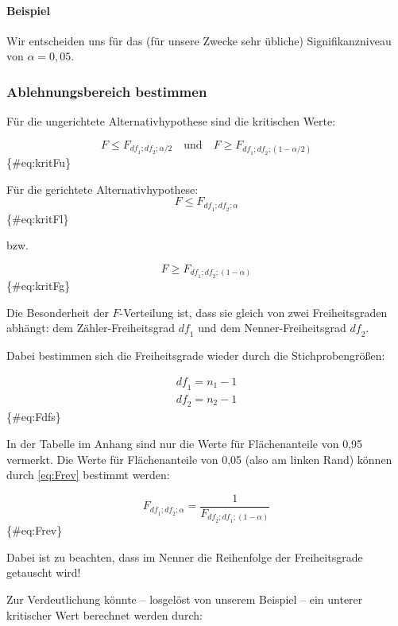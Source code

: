 \documentclass[
  ngerman,
]{article}
\begin{document}
\hypertarget{beispiel-19}{%
\paragraph{Beispiel}\label{beispiel-19}}

Wir entscheiden uns für das (für unsere Zwecke sehr übliche) Signifikanzniveau von \(\alpha=0{,}05\).

\hypertarget{ablehnungsbereich-bestimmen-3}{%
\subsubsection{Ablehnungsbereich bestimmen}\label{ablehnungsbereich-bestimmen-3}}

Für die ungerichtete Alternativhypothese sind die kritischen Werte:

\[
F \leq F_{\mathit{df}_1;\mathit{df}_2;\alpha/2} \quad \textrm{und} \quad F \geq F_{\mathit{df}_1;\mathit{df}_2;(1-\alpha/2)}
\]\{\#eq:kritFu\}

Für die gerichtete Alternativhypothese:
\[
F \leq F_{\mathit{df}_1;\mathit{df}_2;\alpha}
\]\{\#eq:kritFl\}

bzw.

\[
F \geq F_{\mathit{df}_1;\mathit{df}_2;(1-\alpha)}
\]\{\#eq:kritFg\}

Die Besonderheit der \(F\)-Verteilung ist, dass sie gleich von zwei Freiheitsgraden abhängt: dem Zähler-Freiheitsgrad \(\mathit{df}_1\) und dem Nenner-Freiheitsgrad \(\mathit{df}_2\).

Dabei bestimmen sich die Freiheitsgrade wieder durch die Stichprobengrößen:

\[\begin{aligned}
\mathit{df}_1=n_1-1\\
\mathit{df}_2=n_2-1
\end{aligned}\]\{\#eq:Fdfs\}

In der Tabelle im Anhang sind nur die Werte für Flächenanteile von 0,95 vermerkt. Die Werte für Flächenanteile von 0,05 (also am linken Rand) können durch \autoref{eq:Frev} bestimmt werden:

\[
F_{\mathit{df}_1;\mathit{df}_2;\alpha}=\frac{1}{F_{\mathit{df}_2;\mathit{df}_1;(1-\alpha)}} 
\]\{\#eq:Frev\}

Dabei ist zu beachten, dass im Nenner die Reihenfolge der Freiheitsgrade getauscht wird!

Zur Verdeutlichung könnte -- losgelöst von unserem Beispiel -- ein unterer kritischer Wert berechnet werden durch:
\end{document}
